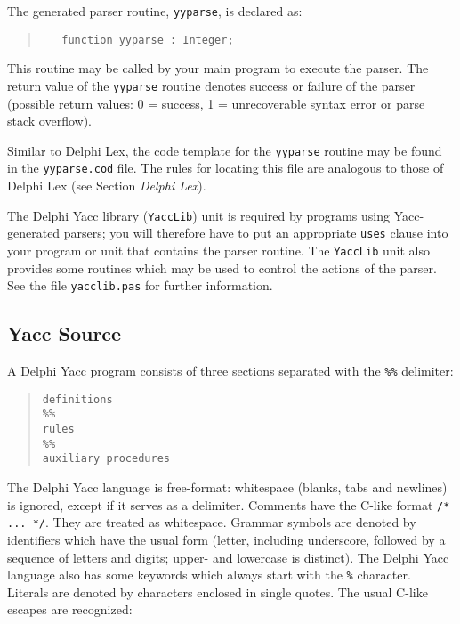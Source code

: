 \documentclass{article}
\begin{document}
The generated parser routine, \verb"yyparse", is declared as:

\begin{quote}\begin{verbatim}
   function yyparse : Integer;
\end{verbatim}\end{quote}

This routine may be called by your main program to execute the parser.
The return value of the \verb"yyparse" routine denotes success or failure of
the parser (possible return values: 0 = success, 1 = unrecoverable syntax
error or parse stack overflow).

Similar to Delphi Lex, the code template for the \verb"yyparse" routine may be
found in the \verb"yyparse.cod" file. The rules for locating this file are
analogous to those of Delphi Lex (see Section {\em Delphi Lex\/}).

The Delphi Yacc library (\verb"YaccLib") unit is required by programs using Yacc-
generated parsers; you will therefore have to put an appropriate \verb"uses"
clause into your program or unit that contains the parser routine. The
\verb"YaccLib" unit also provides some routines which may be used to control
the actions of the parser. See the file \verb"yacclib.pas" for further
information.

\subsection{Yacc Source}

A Delphi Yacc program consists of three sections separated with the \verb"%%"
delimiter:

\begin{quote}\begin{verbatim}
definitions
%%
rules
%%
auxiliary procedures
\end{verbatim}\end{quote}

The Delphi Yacc language is free-format: whitespace (blanks, tabs and newlines)
is ignored, except if it serves as a delimiter. Comments have the C-like
format \verb"/* ... */". They are treated as whitespace. Grammar symbols are
denoted by identifiers which have the usual form (letter, including
underscore, followed by a sequence of letters and digits; upper- and
lowercase is distinct). The Delphi Yacc language also has some keywords which
always start with the \verb"%" character. Literals are denoted by characters
enclosed in single quotes. The usual C-like escapes are recognized:
\end{document}
